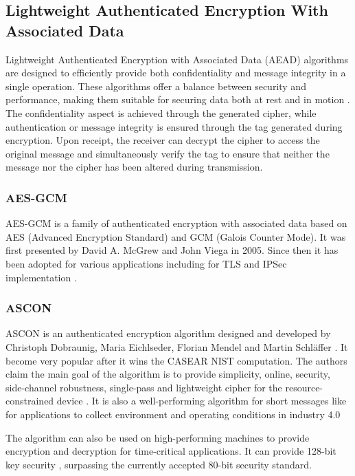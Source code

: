 \subsection{Lightweight Authenticated Encryption With Associated Data }


Lightweight Authenticated Encryption with Associated Data (AEAD) algorithms are designed to efficiently provide both confidentiality and message integrity in a single operation. These algorithms offer a balance between security and performance, making them suitable for securing data both at rest and in motion \cite{el-hajj_analysis_2023}. The confidentiality aspect is achieved through the generated cipher, while authentication or message integrity is ensured through the tag generated during encryption. Upon receipt, the receiver can decrypt the cipher to access the original message and simultaneously verify the tag to ensure that neither the message nor the cipher has been altered during transmission.

\subsubsection*{AES-GCM}

AES-GCM is a family of authenticated encryption with associated data based on AES (Advanced Encryption Standard) and GCM (Galois Counter Mode). It was first presented by David A. McGrew and John Viega \cite{mcgrew_galoiscounter_nodate} in 2005. Since then it has been adopted for various applications including for TLS and IPSec implementation \cite{salowey_aes_2008}.  


\subsubsection*{ASCON}

ASCON is an authenticated encryption algorithm designed and developed by Christoph Dobraunig, Maria Eichlseder, Florian Mendel and Martin Schläffer \cite{dobraunigAsconV1Lightweight2021}. It become very popular after it wins the CASEAR NIST computation. The authors claim the main goal of the algorithm is to provide simplicity, online, security, side-channel robustness, single-pass and lightweight cipher for the resource-constrained device \cite{dobraunigAsconV1Lightweight2021}. It is also a well-performing algorithm for short messages \cite{dobraunigAsconV1Lightweight2021} like for applications to collect environment and operating conditions in industry 4.0

The algorithm can also be used on high-performing machines to provide encryption and decryption for time-critical applications. It can provide 128-bit key security \cite{dobraunigAsconV1Lightweight2021}, surpassing the currently accepted 80-bit security standard.


